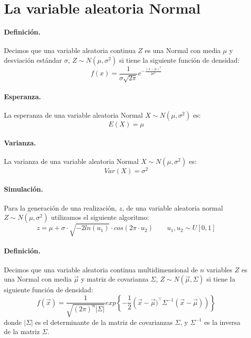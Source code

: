 
\section{La variable aleatoria Normal}

\paragraph{Definici\'on.} Decimos que una variable aleatoria continua $Z$ es 
una Normal con media $\mu$ y desviaci\'on est\'andar $\sigma$, 
$Z \sim N(\mu, \sigma^2)$ si tiene la siguiente funci\'on de densidad:
\begin{displaymath}
f(x) = \frac{1}{\sigma \sqrt{2 \pi}} e^{-\frac{(x-\mu)^2}{2 \sigma^2}}
\end{displaymath}

\paragraph{Esperanza.} La esperanza de una variable aleatoria Normal 
$X \sim N(\mu,\sigma^2)$ es:
\begin{displaymath}
E(X) = \mu
\end{displaymath}

\paragraph{Varianza.} La varianza de una variable aleatoria Normal 
$X \sim N(\mu,\sigma^2)$ es:
\begin{displaymath}
Var(X)= \sigma^2
\end{displaymath}

\paragraph{Simulaci\'on.} Para la generaci\'on de una realizaci\'on, $z$, de 
una variable aleatoria normal $Z \sim N(\mu, \sigma^2)$ utilizamos el siguiente 
algoritmo:
\begin{displaymath}
z = \mu + \sigma\cdot \sqrt{-2 ln(u_1)} \cdot cos(2 \pi \cdot u_2)
\qquad u_1, u_2 \sim U[0,1]
\end{displaymath}

\paragraph{Definici\'on.} Decimos que una variable aleatoria continua 
multidimensional de $n$ variables $Z$ es una Normal con media $\vec{\mu}$ y 
matriz de covarianza $\Sigma$, $Z \sim N(\vec{\mu}, \Sigma)$ si tiene la 
siguiente funci\'on de densidad:
\begin{displaymath}
f(\vec{x}) = \frac{1}{\sqrt{(2 \pi)^n \left| \Sigma \right|}} 
exp\left\{-\frac{1}{2}\left(\vec{x}-\vec{\mu})^{\top} \Sigma^{-1} (\vec{x}-\vec{\mu}) \right)\right\}
\end{displaymath}
donde $\left|\Sigma\right|$ es el determinante de la matriz de covarianzas 
$\Sigma$, y $\Sigma^{-1}$ es la inversa de la matriz $\Sigma$.

